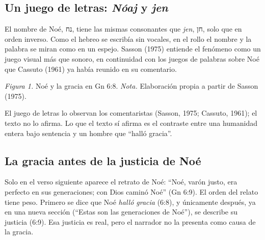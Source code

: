 \documentclass[11pt,letterpaper]{article}
\newcommand{\heb}[1]{\mbox{\foreignlanguage{hebrew}{#1}}}
\begin{document}
\subsection{Un juego de letras: \emph{Nóaj} y \emph{jen}}
El nombre de Noé, \heb{נח}, tiene las mismas consonantes que \emph{jen}, \heb{חן}, solo que en orden inverso. Como el hebreo se escribía sin vocales, en el rollo el nombre y la palabra se miran como en un espejo. Sasson (1975) entiende el fenómeno como un juego visual más que sonoro, en continuidad con los juegos de palabras sobre Noé que Cassuto (1961) ya había reunido en su comentario.

\begin{center}
\par
{\footnotesize\color{gris}\textit{Figura 1.} Noé y la gracia en Gn 6:8. \textit{Nota.} Elaboración propia a partir de Sasson (1975).}
\end{center}

\begin{nota}[Precisión]
El juego de letras lo observan los comentaristas (Sasson, 1975; Cassuto, 1961); el texto no lo afirma. Lo que el texto sí afirma es el contraste entre una humanidad entera bajo sentencia y un hombre que ``halló gracia''.
\end{nota}

\subsection{La gracia antes de la justicia de Noé}
Solo en el verso siguiente aparece el retrato de Noé: ``Noé, varón justo, era perfecto en sus generaciones; con Dios caminó Noé'' (Gn 6:9). El orden del relato tiene peso. Primero se dice que Noé \emph{halló gracia} (6:8), y únicamente después, ya en una nueva sección (``Estas son las generaciones de Noé''), se describe su justicia (6:9). Esa justicia es real, pero el narrador no la presenta como causa de la gracia.
\end{document}
